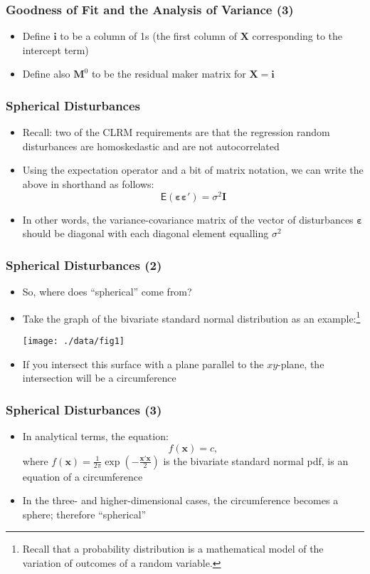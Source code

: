 \documentclass[10pt]{beamer}
\theoremstyle{definition}
\begin{document}
\begin{frame}[fragile]
\frametitle{Goodness of Fit and the Analysis of Variance (3)}
\begin{itemize}
	\item Define $\mathbf{i}$ to be a column of 1s (the first column of $\mathbf{X}$ corresponding to the intercept term)
	\item Define also $\mathbf{M}^{0}$ to be the residual maker matrix for $\mathbf{X = i}$
\end{itemize}
\end{frame}
\fi

\begin{frame}[fragile]
\frametitle{Spherical Disturbances}
\begin{itemize}
	\item Recall: two of the CLRM requirements are that the regression random disturbances are homoskedastic and are not autocorrelated
	\item Using the expectation operator and a bit of matrix notation, we can write the above in shorthand as follows:
	\[
		\mathsf{E}(\bm{\varepsilon\varepsilon}') = \sigma^{2}\mathbf{I}
	\]
	\item In other words, the variance-covariance matrix of the vector of disturbances $\bm{\varepsilon}$ should be diagonal with each diagonal element equalling $\sigma^{2}$
\end{itemize}
\end{frame}

\begin{frame}[fragile]
\frametitle{Spherical Disturbances (2)}
\begin{itemize}
	\item So, where does ``spherical'' come from?
	\item Take the graph of the bivariate standard normal distribution as an example:\footnote{Recall that a probability distribution is a mathematical model of the variation of outcomes of a random variable.}
	\begin{center}
		\texttt{[image: ./data/fig1]}
	\end{center}
	\item If you intersect this surface with a plane parallel to the $xy$-plane, the intersection will be a circumference
\end{itemize} 
\end{frame}

\begin{frame}[fragile]
\frametitle{Spherical Disturbances (3)}
\begin{itemize}
	\item In analytical terms, the equation:
	\[
		f(\mathbf{x}) = c,
	\]
	where $f(\mathbf{x}) = \displaystyle \frac{1}{2\pi}\exp\left(-\frac{\mathbf{x'x}}{2}\right)$ is the bivariate standard normal pdf, is an equation of a circumference
	\item In the three- and higher-dimensional cases, the circumference becomes a sphere; therefore ``spherical''
\end{itemize}
\end{frame}
\end{document}
